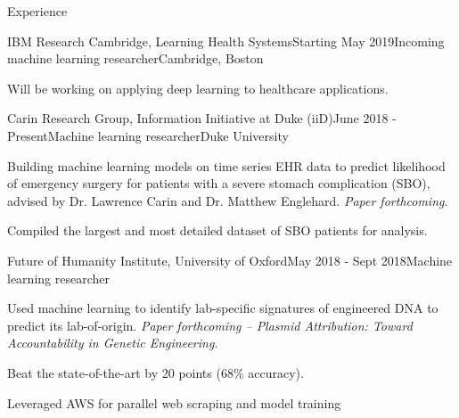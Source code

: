 \documentclass{resume} %
\begin{document}

\begin{rSection}{Experience}

\begin{rSubsection}{IBM Research Cambridge, Learning Health Systems}{Starting May 2019}{Incoming machine learning researcher}{Cambridge, Boston}
	\item Will be working on applying deep learning to healthcare applications.
\end{rSubsection}

\begin{rSubsection}{Carin Research Group, Information Initiative at Duke (iiD)}{June 2018 - Present}{Machine learning researcher}{Duke University}
\item Building machine learning models on time series EHR data to predict likelihood of emergency surgery for patients with a severe stomach complication (SBO), advised by Dr. Lawrence Carin and Dr. Matthew Englehard. \textit{Paper forthcoming}.
\item Compiled the largest and most detailed dataset of SBO patients for analysis.

\end{rSubsection}

\begin{rSubsection}{Future of Humanity Institute, University of Oxford}{May 2018 - Sept 2018}{Machine learning researcher}{}
\item Used machine learning to identify lab-specific signatures of engineered DNA to predict its lab-of-origin. \textit{Paper forthcoming -- Plasmid Attribution: Toward Accountability in Genetic Engineering}.
\item Beat the state-of-the-art by 20 points (68\% accuracy).
\item Leveraged AWS for parallel web scraping and model training
\end{rSubsection}



\end{rSection}
\end{document}
